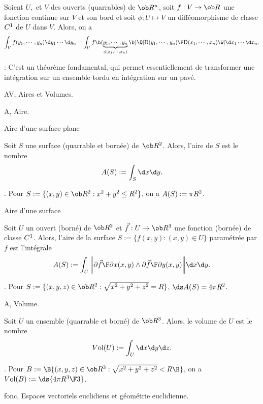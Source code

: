 \Theoreme [Title=Théorème de changement de variable] 
Soient $U,$ et $V$ des ouverts (quarrables) de $\ob R^n$, soit 
$f:V\to\ob R$ une fonction continue sur $V$ et son bord 
et soit $\phi:U\mapsto V$ un difféomorphisme de classe $\sc C^1$ de $U$ dans $V$. 
Alors, on a 
$$
\int_Vf(y_1,\cdots,y_n)\d y_1\cdots\d y_n
=\int_Uf\b(\underbrace{y_1,\cdots,y_n}_{\phi(x_1,\cdots,x_n)}\b)
\Q|{\mbox{D}(y_1,\cdots,y_n)\F\mbox{D}(x_1,\cdots,x_n)}\W|\d x_1\cdots\d x_n. 
$$

\Remarque : C'est un théorème fondamental, qui permet essentiellement de transformer 
une intégration sur un ensemble tordu en intégration sur un pavé. 
\bigskip

\Section AV, Aires et Volumes.

\Subsection A, Aire. 

\Concept Aire d'une surface plane 

\Definition [] Soit $S$ une surface (quarrable et bornée) de~$\ob R^2$. 
Alors, l'aire de $S$ est le nombre 
$$
\sc A(S):=\int_S\d x\d y. 
$$

\Exemple.  Pour $S:=\{(x,y)\in\ob R^2:x^2+y^2\le R^2\}$, on a $\sc A(S):=\pi R^2$. 
\bigskip 

\Concept Aire d'une surface

\Definition []Soit $U$ un ouvert (borné) de $\ob R^2$ et $\vec f:U\to\ob R^3$ 
une fonction (bornée) de classe $\sc C^1$. Alors, l'aire de la surface 
$S:=\{f(x,y):(x,y)\in U\}$ 
paramétrée par $f$ est l'intégrale 
$$
\sc A(S):=\int_U\bigg|\!\bigg|{\partial \vec f\F\partial x}(x,y)\wedge{\partial\vec f\F\partial y}(x,y)\bigg|\!\bigg|\d x\d y. 
$$
\smallskip

\Exemple.  Pour $S:=\{(x,y,z)\in\ob R^2:\sqrt{x^2+y^2+z^2}=R\}$, 
$\ds\sc A(S)=4\pi R^2$. 
\bigskip

\Subsection A, Volume.

\Definition []Soit $U$ un ensemble (quarrable et borné) de $\ob R^3$. Alors, le volume de $U$ est le nombre
$$
\sc V\mbox{ol}(U):=\int_U\d x\d y\d z. 
$$

\Exemple.  Pour $B:=\B\{(x,y,z)\in\ob R^3:\sqrt{x^2+y^2+z^2}<R\B\}$, on a $\sc V\mbox{ol}(B):=\ds{4\pi R^3\F3}$. 

\eject





\pagetitretrue


\Chapter fonc, Espaces vectoriels euclidiens et géométrie euclidienne. 
\bigskip

